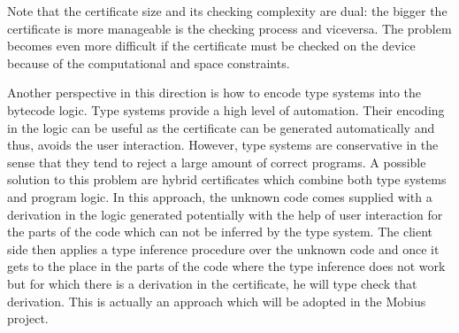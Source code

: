 Note that the certificate size and its checking complexity are dual: the bigger the certificate is more manageable is the checking process and viceversa. 
The problem becomes even more difficult if the certificate must be checked on the device because of the computational and space constraints.
 


  
%  
% 
%        
%     



Another perspective in this direction is how   to encode type systems into the bytecode logic. 
Type systems provide a high level of automation. 
Their encoding in the logic can be useful as the certificate can be generated
 automatically and thus, avoids the user interaction. However, type systems are  conservative in the sense 
that they tend to reject a large amount of correct programs. A possible solution to this problem are hybrid certificates which combine both type systems and program 
logic. In this approach, the unknown code comes supplied with a  derivation in the logic generated potentially with the help of user interaction 
for the parts of the  code which can not be inferred by the type system.   The client side then applies a type inference procedure over  the
 unknown code and once it gets to the place in the parts of the code where the 
type inference does not work but for which there is a derivation in the certificate, he will type check that derivation.   
This is actually an approach which will be adopted in the Mobius project. 


